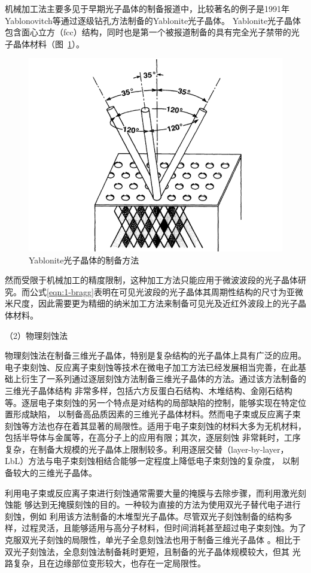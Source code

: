 机械加工法主要多见于早期光子晶体的制备报道中，比较著名的例子是1991年Yablonovitch等通过逐级钻孔方法制备的Yablonite光子晶体\cite{Yablonovitch1991Photonic}。
Yablonite光子晶体包含面心立方（fcc）结构，同时也是第一个被报道制备的具有完全光子禁带的光子晶体材料（图~\ref{fig:yablonite}）。
\begin{figure}[htbp]
	\centering
	\includegraphics[width=0.6\linewidth]{figures/yablonite.png}
	\caption{Yablonite光子晶体的制备方法\cite{Yablonovitch1991Photonic}}
	\label{fig:yablonite}
\end{figure}
然而受限于机械加工的精度限制，这种加工方法只能应用于微波波段的光子晶体研究。而公式\ref{eqn:1-bragg}表明在可见光波段的光子晶体其周期性结构的尺寸为亚微米尺度，因此需要更为精细的纳米加工方法来制备可见光及近红外波段上的光子晶体材料。

（2）物理刻蚀法

物理刻蚀法在制备三维光子晶体，特别是复杂结构的光子晶体上具有广泛的应用。
电子束刻蚀、反应离子束刻蚀等技术在微电子加工方法已经发展相当完善，在此基础上衍生了一系列通过逐层刻蚀方法制备三维光子晶体的方法。通过该方法制备的三维光子晶体结构
非常多样，包括六方反蛋白石结构\cite{Johnson2000ThreeDimensionally}、木堆结构\cite{Lin1998ThreeDimensional,Noda2000Full}、金刚石结构\cite{Qi2004ThreeDimensional}等。逐层电子束刻蚀的另一个特点是对结构的局部缺陷的控制，能够实现在特定位置形成缺陷，
以制备高品质因素的三维光子晶体材料\cite{Blanco2000LargeScale,Juarez2004Selective}。然而电子束或反应离子束刻蚀等方法也存在着其显著的局限性。适用于电子束刻蚀的材料大多为无机材料，包括半导体与金属等，在高分子上的应用有限；其次，逐层刻蚀
非常耗时，工序复杂，在制备大规模的光子晶体上限制较多。利用逐层交替（layer-by-layer，LbL）方法与电子束刻蚀相结合能够一定程度上降低电子束刻蚀的复杂度，
以制备较大的三维光子晶体\cite{Aoki2002ThreeDimensional,Aoki2003Microassembly}。

利用电子束或反应离子束进行刻蚀通常需要大量的掩膜与去除步骤，而利用激光刻蚀能
够达到无掩膜刻蚀的目的。一种较为直接的方法为使用双光子替代电子进行刻蚀，例如
利用该方法制备的木堆型光子晶体\cite{Cumpston1999TwoPhoton}。尽管双光子刻蚀制备的结构多样，过程灵活，且能够适用与高分子材料，但时间消耗甚至超过电子束刻蚀。为了克服双光子刻蚀的局限性，单光子全息刻蚀法也用于制备三维光子晶体
\cite{Campbell2000Fabrication}。相比于双光子刻蚀法，全息刻蚀法制备耗时更短，且制备的光子晶体规模较大，但其
光路复杂，且在边缘部位变形较大，也存在一定局限性。

